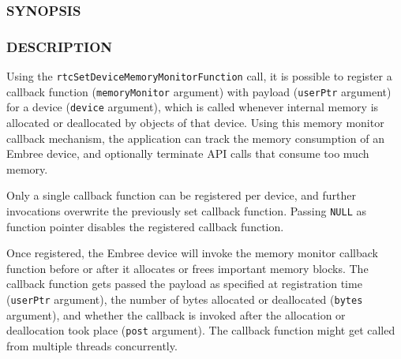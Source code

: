 \subsubsection{SYNOPSIS}\label{synopsis}

\begin{Shaded}
\begin{Highlighting}[]

  \OperatorTok{(*}\OperatorTok{)(}
  \OperatorTok{*}\OperatorTok{,}
  \OperatorTok{,}
\OperatorTok{);}

\OperatorTok{(}
\OperatorTok{,}
\OperatorTok{,}
  \OperatorTok{*}
\OperatorTok{);}
\end{Highlighting}
\end{Shaded}

\subsubsection{DESCRIPTION}\label{description}

Using the \texttt{rtcSetDeviceMemoryMonitorFunction} call, it is
possible to register a callback function (\texttt{memoryMonitor}
argument) with payload (\texttt{userPtr} argument) for a device
(\texttt{device} argument), which is called whenever internal memory is
allocated or deallocated by objects of that device. Using this memory
monitor callback mechanism, the application can track the memory
consumption of an Embree device, and optionally terminate API calls that
consume too much memory.

Only a single callback function can be registered per device, and
further invocations overwrite the previously set callback function.
Passing \texttt{NULL} as function pointer disables the registered
callback function.

Once registered, the Embree device will invoke the memory monitor
callback function before or after it allocates or frees important memory
blocks. The callback function gets passed the payload as specified at
registration time (\texttt{userPtr} argument), the number of bytes
allocated or deallocated (\texttt{bytes} argument), and whether the
callback is invoked after the allocation or deallocation took place
(\texttt{post} argument). The callback function might get called from
multiple threads concurrently.


